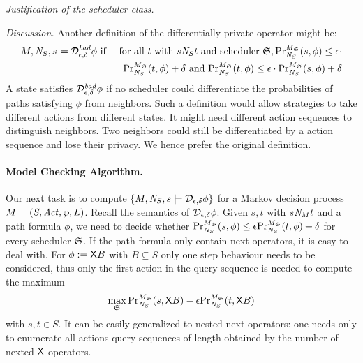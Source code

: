 \noindent
\emph{Justification of the scheduler class.}

\noindent
\emph{Discussion.}
Another definition of the differentially private operator
might be:
\begin{eqnarray*}
  M, \neighbor{S}, s \models \dpriv{\epsilon}{\delta}^{\mathit{bad}} \phi
  & \textmd{ if } &
  \textmd{for all } t \textmd{ with } s \neighbor{S} t \textmd{ and
  scheduler } \scheduler{S},
  \myPr{s}{M_{\scheduler{S}}}{\neighbor{S}}{\phi} \leq
  \epsilon \cdot\\
  && \myPr{t}{M_{\scheduler{S}}}{\neighbor{S}}{\phi} + \delta \textmd{ and }
  \myPr{t}{M_{\scheduler{S}}}{\neighbor{S}}{\phi} \leq
  \epsilon \cdot \myPr{s}{M_{\scheduler{S}}}{\neighbor{S}}{\phi}
  + \delta
\end{eqnarray*}
A state satisfies $\dpriv{\epsilon}{\delta}^{\mathit{bad}} \phi$ if
no scheduler could differentiate the probabilities of paths satisfying
$\phi$ from neighbors. Such a definition would allow strategies to
take different actions from different states. It might need different
action sequences to distinguish neighbors. Two neighbors could still be
differentiated by a action sequence and lose their privacy. We hence
prefer the original definition.

\paragraph{Model Checking Algorithm.}

Our next task is to compute $\{ M, \neighbor{S}, s \models
\dpriv{\epsilon}{\delta} \phi \}$ for a Markov decision process $M =
(S, \Act, \wp, L)$. Recall the semantics of $\dpriv{\epsilon}{\delta}
\phi$. Given $s, t$ with $s \neighbor{M} t$ and a path formula
$\phi$, we need to decide whether
$\myPr{s}{M_{\scheduler{S}}}{\neighbor{S}}{\phi} \leq
\epsilon \myPr{t}{M_{\scheduler{S}}}{\neighbor{S}}{\phi} + \delta$
for every scheduler $\scheduler{S}$.
If the path formula only contain next operators, it is easy to deal with. For $\phi:=\X B$ with $B\subseteq S$ only one step behaviour needs to be considered, thus only the first action in the query sequence is needed to compute the maximum
\begin{eqnarray}
  \label{eqn:max-nextB}
\max_{\scheduler{S}}
\myPr{s}{M_{\scheduler{S}}}{\neighbor{S}}{\gX B} -
\epsilon \myPr{t}{M_{\scheduler{S}}}{\neighbor{S}}{\gX B}
\end{eqnarray}
with $s, t \in S$. It can be easily generalized to nested next operators:  one needs only to enumerate
all actions query sequences of length obtained by the number of nexted $\X$ operators.

